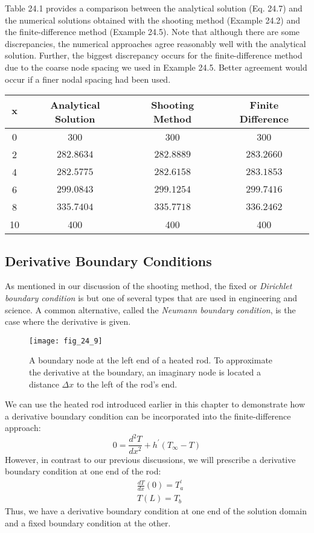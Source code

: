 \documentclass[../main.tex]{subfiles}
\begin{document}
Table 24.1 provides a comparison between the analytical solution (Eq. 24.7) and the 
numerical solutions obtained with the shooting method (Example 24.2) and the finite-difference method (Example 24.5). Note that although there are some discrepancies, the
numerical approaches agree reasonably well with the analytical solution. Further, the biggest
discrepancy occurs for the finite-difference method due to the coarse node spacing we used
in Example 24.5. Better agreement would occur if a finer nodal spacing had been used.
\begin{center}
    \begin{tabular}{cccc}
        \hline $\boldsymbol{x}$ & Analytical Solution & Shooting Method & Finite Difference \\
        \hline 0 & 300 & 300 & 300 \\
        2 & $282.8634$ & $282.8889$ & $283.2660$ \\
        4 & $282.5775$ & $282.6158$ & $283.1853$ \\
        6 & $299.0843$ & $299.1254$ & $299.7416$ \\
        8 & $335.7404$ & $335.7718$ & $336.2462$ \\
        10 & 400 & 400 & 400 \\
        \hline
    \end{tabular}    
\end{center}

\subsection{Derivative Boundary Conditions}

\noindent As mentioned in our discussion of the shooting method, the fixed or \textit{Dirichlet boundary condition} is but one of several types that are used in engineering and science. A common alternative, called the \textit{Neumann boundary condition}, is the case where the derivative is given.

\begin{figure}[H]
    \centering
    \texttt{[image: fig\_24\_9]}
   \caption{\textsf{A boundary node at the left end of a heated rod. To approximate the derivative at the boundary,
   an imaginary node is located a distance $\Delta x$ to the left of the rod's end.}}\label{fig:fig_24_9}
\end{figure}

We can use the heated rod introduced earlier in this chapter to demonstrate how a derivative boundary condition can be incorporated into the finite-difference approach:
$$
0=\frac{d^{2} T}{d x^{2}}+h^{\prime}\left(T_{\infty}-T\right)
$$
However, in contrast to our previous discussions, we will prescribe a derivative boundary condition at one end of the rod:
$$
\begin{aligned}
&\frac{d T}{d x}(0)=T_{a}^{\prime} \\
&T(L)=T_{b}
\end{aligned}
$$
Thus, we have a derivative boundary condition at one end of the solution domain and a fixed boundary condition at the other.
\end{document}
